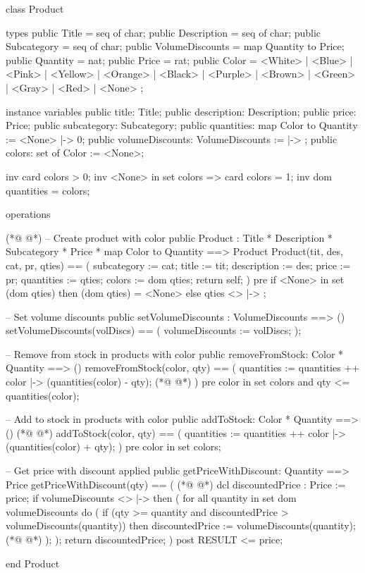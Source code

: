 \begin{vdmpp}[breaklines=true]
class Product

types
 public Title = seq of char;
 public Description = seq of char;
 public Subcategory = seq of char;
 public VolumeDiscounts =  map Quantity to Price;
 public Quantity = nat;
 public Price = rat;
 public Color = <White> | <Blue> | <Pink> | <Yellow> | <Orange> | <Black> | <Purple> | <Brown> | <Green> | <Gray> | <Red> | <None> ;
 
instance variables
  public title: Title;
  public description: Description;
  public price: Price;
  public subcategory: Subcategory;
  public quantities: map Color to Quantity := { <None> |-> 0};
  public volumeDiscounts: VolumeDiscounts := { |-> };
  public colors: set of Color := {<None>};
  
  inv card colors > 0;
  inv <None> in set colors => card colors = 1;
  inv dom quantities = colors;

operations
 
(*@
\label{Product:27}
@*)
 -- Create product with color
 public Product : Title * Description * Subcategory * Price * map Color to Quantity ==> Product
 Product(tit, des, cat, pr, qties) == (
  subcategory := cat;
   title := tit;
   description := des;
   price := pr;
   quantities := qties;
   colors := dom qties;
   return self;
 )
 pre
  if <None> in set (dom qties)
  then (dom qties) = {<None>}
  else qties <> { |-> };
  
 -- Set volume discounts
 public setVolumeDiscounts : VolumeDiscounts ==> ()
 setVolumeDiscounts(volDiscs) == (
  volumeDiscounts := volDiscs;
 );
 
 -- Remove from stock in products with color
 public removeFromStock: Color * Quantity ==> ()
 removeFromStock(color, qty) == (
  quantities := quantities ++ {color |-> (quantities(color) - qty)};
(*@
\label{setVolumeDiscounts:53}
@*)
 )
 pre color in set colors
  and qty <= quantities(color);
 
 -- Add to stock in products with color
 public addToStock: Color * Quantity ==> ()
(*@
\label{removeFromStock:59}
@*)
 addToStock(color, qty) == (
  quantities := quantities ++ {color |-> (quantities(color) + qty)};
 )
 pre color in set colors;
 
 -- Get price with discount applied
 public getPriceWithDiscount: Quantity ==> Price 
 getPriceWithDiscount(qty) == (
(*@
\label{addToStock:67}
@*)
  dcl discountedPrice : Price := price;
  if volumeDiscounts <> { |-> }
  then (
   for all quantity in set dom volumeDiscounts
    do (
     if (qty >= quantity and discountedPrice > volumeDiscounts(quantity))
     then discountedPrice := volumeDiscounts(quantity);
(*@
\label{getPriceWithDiscount:74}
@*)
    );
   );
  return discountedPrice;
 )
 post RESULT <= price;

end Product
\end{vdmpp}
